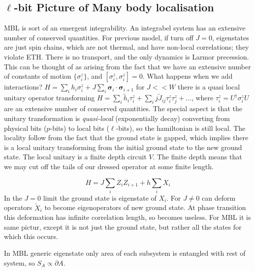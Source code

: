 \documentclass[a4paper]{article}
\begin{document}
\subsection{$\ell$-bit Picture of Many body localisation}
MBL is sort of an emergent integrability. An integrabel system has an extensive
number of conserved quantities. For previous model, if turn off $J=0$,
eigenstates are just spin chains, which are not thermal, and have non-local
correlations; they violate
ETH. There
is no transport, and the only dynamics is Larmor precession. This can be thought
of as arising from the fact that we have an extensive number of constants of
motion $\{\sigma_i^z\}$, and $[\sigma^z_i,\sigma_i^z]=0$.
What happens when we add interactions? $H=\sum_i h_i\sigma_i^z +J\sum_i
\boldsymbol{\sigma}_i\cdot\boldsymbol{\sigma}_{i+1}$ for $J<<W$ there is a quasi local
unitary operator transforming $H=\sum_i \tilde{h}_i \tau_i^z +\sum_ij
\tilde{J}_{ij}\tau_i^z\tau_j^z+\dots$, where $\tau_i^z=U^\dagger \sigma_i^z U$
are an extensive number of conserved quantities. The special aspect is that the
unitary transformation is \emph{quasi-local} (exponentially decay) converting from physical bits
($p$-bits) to local bits ($\ell$-bits), so the hamiltonian is still local. The
locality follow from the fact that the ground state is gapped, which implies
there is a local unitary transforming from the initial ground state to the new
ground state. The local unitary is a finite depth circuit $V$. The finite depth
means that we may cut off the tails of our dressed operator at some finite
length.
\begin{example}
    \[
    H=J\sum_i Z_i Z_{i+1} + h\sum_i X_i
\]
In the $J=0$ limit the ground state is eigenstate of $X_i$. For $J\neq 0$ can
deform operators $\tilde{X}_i$ to become eigenoperators of new ground state. At
phase transition this deformation has infinite correlation length, so becomes
useless. For MBL it is same pictur, except it is not just the ground state,
but rather all the states for which this occurs. 
\end{example}
\begin{example}
    In MBL generic eigenstate only area of each subsystem is entangled with rest
    of system, so $S_A \propto \partial A$.
\end{example}
\end{document}
